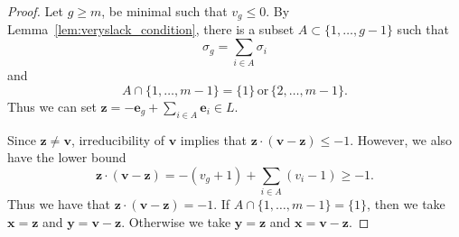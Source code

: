 \documentclass{amsart} %
\newcommand{\e}{\bm{e}}
\newcommand{\bv}{\bm{v}}
\theoremstyle{thm}
\theoremstyle{definition}
\numberwithin{equation}{section}
\begin{document}
\begin{proof}
Let $g\geq m$, be minimal such that $v_g \leq 0$. By Lemma~\ref{lem:veryslack_condition}, there is a subset $A\subset \{1, \dots, g-1\}$ such that
\[
\sigma_g = \sum_{i\in A} \sigma_i
\]
and
\[
A \cap \{1, \dots, m-1\}=\{1\} \,\text{or}\, \{2, \dots, m-1\}.
\]
Thus we can set $\bm{z}=-\e_g + \sum_{i\in A} \e_i \in L$. 

Since $\bm{z}\neq \bv$, irreducibility of $\bv$ implies that $\bm{z}\cdot (\bv-\bm{z})\leq -1$. However, we also have the lower bound
\[
    \bm{z}\cdot(\bv-\bm{z}) = -(v_g +1) +\sum_{i\in A} (v_i -1)\geq -1.
\]
Thus we have that $\bm{z}\cdot (\bv-\bm{z})= -1$.
If $A \cap \{1, \dots, m-1\}=\{1\}$, then we take $\bm{x}=\bm{z}$ and $\bm{y}=\bv-\bm{z}$. Otherwise we take $\bm{y}=\bm{z}$ and $\bm{x}=\bv-\bm{z}$.
\end{proof}
\end{document}
